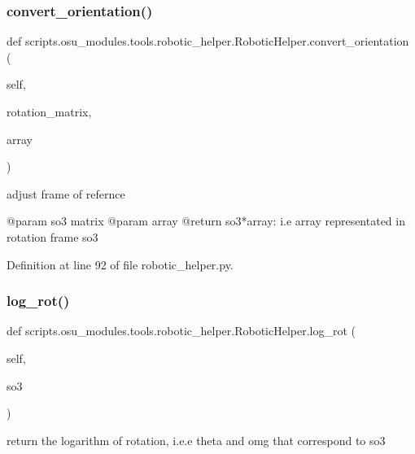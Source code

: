 \subsubsection{\texorpdfstring{convert\+\_\+orientation()}{convert\_orientation()}}
{\footnotesize\ttfamily def scripts.\+osu\+\_\+modules.\+tools.\+robotic\+\_\+helper.\+Robotic\+Helper.\+convert\+\_\+orientation (\begin{DoxyParamCaption}\item[{}]{self,  }\item[{}]{rotation\+\_\+matrix,  }\item[{}]{array }\end{DoxyParamCaption})}

\begin{DoxyVerb}adjust frame of refernce

    @param so3 matrix
    @param array
    @return so3*array: i.e array representated in rotation frame so3
\end{DoxyVerb}
 

Definition at line 92 of file robotic\+\_\+helper.\+py.

\mbox{\label{classscripts_1_1osu__modules_1_1tools_1_1robotic__helper_1_1RoboticHelper_a81792910e5b298b065ebc261f21f391b}} 
\subsubsection{\texorpdfstring{log\+\_\+rot()}{log\_rot()}}
{\footnotesize\ttfamily def scripts.\+osu\+\_\+modules.\+tools.\+robotic\+\_\+helper.\+Robotic\+Helper.\+log\+\_\+rot (\begin{DoxyParamCaption}\item[{}]{self,  }\item[{}]{so3 }\end{DoxyParamCaption})}

\begin{DoxyVerb}return the logarithm of rotation,
i.e.e theta and omg that correspond to so3
\end{DoxyVerb}
 

